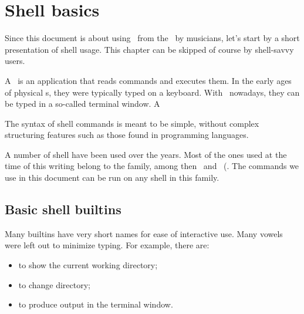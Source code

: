 
\chapter{Shell basics}

Since this document is about using \mf\ from the \CLI\ by musicians, let's start by a short presentation of shell usage. This chapter can be skipped of course by shell-savvy users.

A \shell\ is an application that reads commands and executes them. In the early ages of physical s, they were typically typed on a keyboard. With \GUI\ nowadays, they can be typed in a so-called terminal window.
A 

The syntax of shell commands is meant to be simple, without complex structuring features such as those found in programming languages.

A number of shell have been used over the years. Most of the ones used at the time of this writing belong to the  family, among then \bash\ and \zsh\ (. The commands we use in this document can be run on any shell in this family.



\section{Basic shell builtins}

Many builtins have very short names for ease of interactive use. Many vowels were left out to minimize typing. For example, there are:
\begin{itemize}
\item {} to show the current working directory;
\item {} to change directory;
\item {} to produce output in the terminal window.
\end{itemize}

